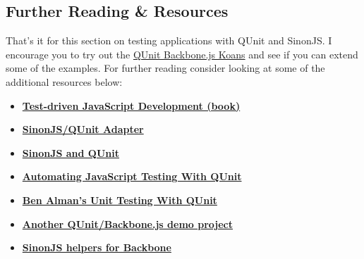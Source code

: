 \documentclass[9pt]{book}
\newenvironment{Shaded}{}{}
\newcommand{\KeywordTok}[1]{\textcolor[rgb]{0.00,0.44,0.13}{\textbf{{#1}}}}
\newcommand{\DataTypeTok}[1]{\textcolor[rgb]{0.56,0.13,0.00}{{#1}}}
\newcommand{\DecValTok}[1]{\textcolor[rgb]{0.25,0.63,0.44}{{#1}}}
\newcommand{\StringTok}[1]{\textcolor[rgb]{0.25,0.44,0.63}{{#1}}}
\newcommand{\CommentTok}[1]{\textcolor[rgb]{0.38,0.63,0.69}{\textit{{#1}}}}
\newcommand{\OtherTok}[1]{\textcolor[rgb]{0.00,0.44,0.13}{{#1}}}
\newcommand{\FunctionTok}[1]{\textcolor[rgb]{0.02,0.16,0.49}{{#1}}}
\newcommand{\NormalTok}[1]{{#1}}
\begin{document}
\begin{Shaded}
\end{Shaded}

\subsection{Further Reading \&
Resources}\label{further-reading-resources}

That's it for this section on testing applications with QUnit and
SinonJS. I encourage you to try out the
\href{https://github.com/addyosmani/backbone-koans-qunit}{QUnit
Backbone.js Koans} and see if you can extend some of the examples. For
further reading consider looking at some of the additional resources
below:

\begin{itemize}
\itemsep1pt\parskip0pt
\item
  \textbf{\href{http://tddjs.com/}{Test-driven JavaScript Development
  (book)}}
\item
  \textbf{\href{http://sinonjs.org/qunit/}{SinonJS/QUnit Adapter}}
\item
  \textbf{\href{http://cjohansen.no/en/javascript/using_sinon_js_with_qunit}{SinonJS
  and QUnit}}
\item
  \textbf{\href{http://msdn.microsoft.com/en-us/scriptjunkie/gg749824}{Automating
  JavaScript Testing With QUnit}}
\item
  \textbf{\href{http://benalman.com/talks/unit-testing-qunit.html}{Ben
  Alman's Unit Testing With QUnit}}
\item
  \textbf{\href{https://github.com/jc00ke/qunit-backbone}{Another
  QUnit/Backbone.js demo project}}
\item
  \textbf{\href{http://devblog.supportbee.com/2012/02/10/helpers-for-testing-backbone-js-apps-using-jasmine-and-sinon-js/}{SinonJS
  helpers for Backbone}}
\end{itemize}
\end{document}

